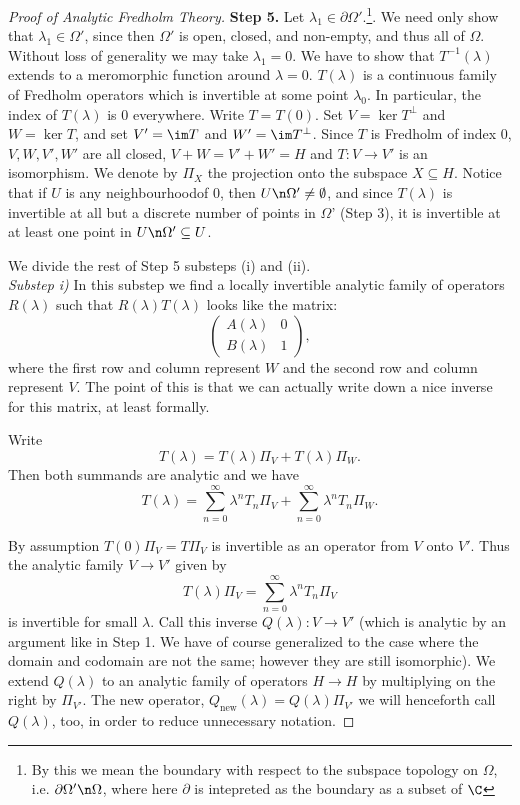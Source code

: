 \documentclass[12pt]{article}
\begin{document}
\begin{proof}[Proof of Analytic Fredholm Theory]
\textbf{Step 5.} Let $\lambda_1 \in \partial \Omega'$.\footnote{By this we mean the boundary with respect to the subspace topology on $\Omega$, i.e. $\partial \Omega' \n \Omega$, where here $\partial$ is intepreted as the boundary as a subset of $\C$}. We need only show that $\lambda_1 \in \Omega'$, since then $\Omega'$ is open, closed, and non-empty, and thus all of $\Omega$. Without loss of generality we may take $\lambda_1 = 0$. We have to show that $T^{-1}(\lambda)$ extends to a meromorphic function around $\lambda=0$. $T(\lambda)$ is a continuous family of Fredholm operators which is invertible at some point $\lambda_0$. In particular, the index of $T(\lambda)$ is $0$ everywhere. Write $T = T(0)$. Set $V = \ker T^\bot$ and $W = \ker T$, and set $V' = \im T$ and $W' = \im T^\bot$. Since $T$ is Fredholm of index $0$, $V,W,V',W'$ are all closed, $V+W = V'+W' = H$ and $T:V\to V'$ is an isomorphism. We denote by $\Pi_X$ the projection onto the subspace $X \subseteq H$. Notice that if $U$ is any neighbourhoodof $0$, then $U \n \Omega' \neq \emptyset$, and since $T(\lambda)$ is invertible at all but a discrete number of points in $\Omega$' (Step 3), it is invertible at at least one point in $U \n \Omega' \subseteq U$.

We divide the rest of Step 5 substeps (i) and (ii).\\

\emph{Substep i) }In this substep we find a locally invertible analytic family of operators $R(\lambda)$ such that $R(\lambda)T(\lambda)$ looks like the matrix:
\begin{equation}\label{matrep}\begin{pmatrix} A(\lambda) & 0\\
B(\lambda) & 1\end{pmatrix},\end{equation}
where the first row and column represent $W$ and the second row and column represent $V$. The point of this is that we can actually write down a nice inverse for this matrix, at least formally.

Write
\[T(\lambda) = T(\lambda)\Pi_V + T(\lambda)\Pi_W.\] Then both summands are analytic and we have
\[T(\lambda) = \sum_{n=0}^\infty \lambda^nT_n\Pi_V + \sum_{n=0}^\infty \lambda^nT_n\Pi_W.\]

By assumption $T(0)\Pi_V = T\Pi_V$ is invertible as an operator from $V$ onto $V'$. Thus the analytic family $V \to V'$ given by
\[T(\lambda)\Pi_V = \sum_{n=0}^\infty \lambda^nT_n\Pi_V\] is invertible for small $\lambda$. Call this inverse $Q(\lambda):V \to V'$ (which is analytic by an argument like in Step 1. We have of course generalized to the case where the domain and codomain are not the same; however they are still isomorphic). We extend $Q(\lambda)$ to an analytic family of operators $H \to H$ by multiplying on the right by $\Pi_{V'}$. The new operator, $Q_{\text{new}}(\lambda) = Q(\lambda)\Pi_{V'}$ we will henceforth call $Q(\lambda)$, too, in order to reduce unnecessary notation.



\end{proof}
\end{document}
